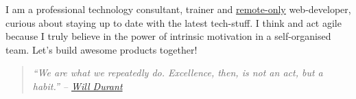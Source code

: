 \documentclass[9pt]{developercv} %
\begin{document}
\vspace{0.5cm}



\begin{minipage}[t]{0.4\textwidth} %
	\vspace{-\baselineskip} %
  I am a professional technology consultant, trainer and \href{https://www.remoteonly.org/}{\uline{remote-only}} web-developer, curious
  about staying up to date with the latest tech-stuff.
  I think and act agile because I truly believe in the power of  intrinsic motivation in a self-organised team.
  Let's build awesome products together!
  \begin{quotation} %
    \itshape{``We are what we repeatedly do. Excellence, then, is not an act, but a habit.''} -- 
    \href{https://medium.com/the-mission/my-favourite-quote-of-all-time-is-a-misattribution-66356f22843d}{Will Durant}\\
  \end{quotation}
\end{minipage}
\hfill %
\begin{minipage}[t]{0.5\textwidth} %
	\vspace{-\baselineskip} %
	\begin{barchart}{5.5}
	\end{barchart}
\end{minipage}

\begin{center}
\end{center}


\end{document}
